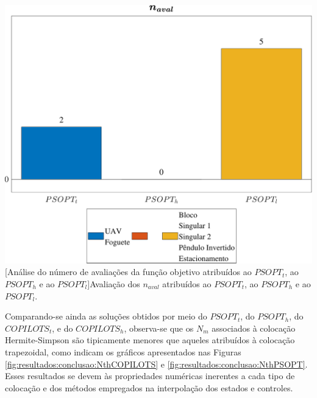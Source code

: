 \noindent	
\begin{minipage}{\textwidth}
	\vspace{\onelineskip}
	\centering
	\includegraphics[width=1\linewidth]{fig/resultados/ranking/3/eval}
	[Análise do número de avaliações da função objetivo atribuídos ao $ PSOPT_t $, ao $ PSOPT_h $ e ao $ PSOPT_l $]{Avaliação dos $ n_{aval} $ atribuídos ao $ PSOPT_t $, ao $ PSOPT_h $ e ao $ PSOPT_l $.}
	\label{fig:resultados:conclusao:navalPSOPTthl}
	\vspace{\onelineskip}
\end{minipage}

Comparando-se ainda as soluções obtidos por meio do $ PSOPT_t $, do $ PSOPT_h $, do $ COPILOTS_t $, e do $ COPILOTS_h $, observa-se que os $ N_m $ associados à colocação Hermite-Simpson são tipicamente menores que aqueles atribuídos à colocação trapezoidal, como indicam os gráficos apresentados nas Figuras \ref{fig:resultados:conclusao:NthCOPILOTS} e \ref{fig:resultados:conclusao:NthPSOPT}. Esses resultados se devem às propriedades numéricas inerentes a cada tipo de colocação e dos métodos empregados na interpolação dos estados e controles.

